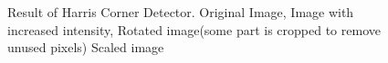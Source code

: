 \begin{figure}[H]
\begin{center}
\end{center}
\caption[Result of Harris Corner Detector]{Result of Harris Corner Detector. Original Image, Image with increased intensity, Rotated image(some part is cropped to remove unused pixels) Scaled image}%
\end{figure}

